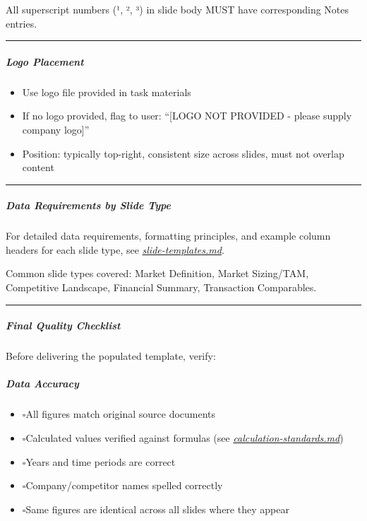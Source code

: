 \documentclass[11pt]{article}
\newcommand{\UncheckedBox}{$\square$}
\begin{document}
All superscript numbers (¹, ², ³) in slide body MUST have corresponding Notes entries.


\vspace{0.5em}\hrule\vspace{0.5em}

\subparagraph{Logo Placement}\mbox{}\par

\begin{itemize}[leftmargin=*,itemsep=2pt,topsep=2pt]
\item {} Use logo file provided in task materials
\item {} If no logo provided, flag to user: ``[LOGO NOT PROVIDED - please supply company logo]''
\item {} Position: typically top-right, consistent size across slides, must not overlap content
\end{itemize}

\vspace{0.5em}\hrule\vspace{0.5em}

\subparagraph{Data Requirements by Slide Type}\mbox{}\par

For detailed data requirements, formatting principles, and example column headers for each slide type, see \href{reference/slide-templates.md\#common-slide-types-and-data-requirements}{\emph{slide-templates.md}}.


Common slide types covered: Market Definition, Market Sizing/TAM, Competitive Landscape, Financial Summary, Transaction Comparables.


\vspace{0.5em}\hrule\vspace{0.5em}

\subparagraph{Final Quality Checklist}\mbox{}\par

Before delivering the populated template, verify:


\subparagraph{Data Accuracy}\mbox{}\par
\begin{itemize}[leftmargin=*,itemsep=2pt,topsep=2pt]
\item {} \UncheckedBox All figures match original source documents
\item {} \UncheckedBox Calculated values verified against formulas (see \href{reference/calculation-standards.md}{\emph{calculation-standards.md}})
\item {} \UncheckedBox Years and time periods are correct
\item {} \UncheckedBox Company/competitor names spelled correctly
\item {} \UncheckedBox Same figures are identical across all slides where they appear
\end{itemize}
\end{document}
